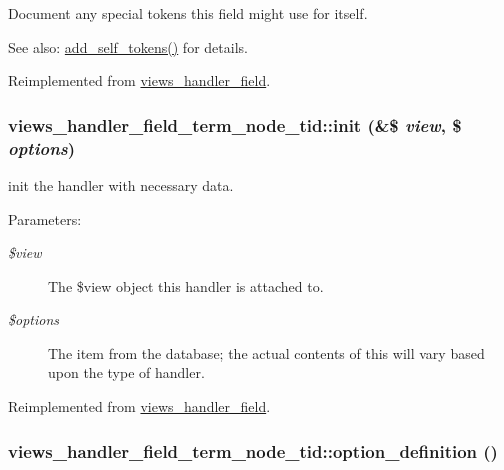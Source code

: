 Document any special tokens this field might use for itself.

\begin{Desc}
\item[See also:]\hyperlink{classviews__handler__field__term__node__tid_7fea3443ab075e3e35212ddc3b0d95f3}{add\_\-self\_\-tokens()} for details. \end{Desc}


Reimplemented from \hyperlink{classviews__handler__field_e33446d1059f13fbfb06a37da04d320e}{views\_\-handler\_\-field}.\hypertarget{classviews__handler__field__term__node__tid_639e45d86c954e90120193b84c8b910b}{
\subsubsection[{init}]{\setlength{\rightskip}{0pt plus 5cm}views\_\-handler\_\-field\_\-term\_\-node\_\-tid::init (\&\$ {\em view}, \/  \$ {\em options})}}
\label{classviews__handler__field__term__node__tid_639e45d86c954e90120193b84c8b910b}


init the handler with necessary data. \begin{Desc}
\item[Parameters:]
\begin{description}
\item[{\em \$view}]The \$view object this handler is attached to. \item[{\em \$options}]The item from the database; the actual contents of this will vary based upon the type of handler. \end{description}
\end{Desc}


Reimplemented from \hyperlink{classviews__handler__field_7eaaf0fd6fbc57c2955f88b257394d19}{views\_\-handler\_\-field}.\hypertarget{classviews__handler__field__term__node__tid_6c6e6369b1897f4f6643a609b1a802a5}{
\subsubsection[{option\_\-definition}]{\setlength{\rightskip}{0pt plus 5cm}views\_\-handler\_\-field\_\-term\_\-node\_\-tid::option\_\-definition ()}}
\label{classviews__handler__field__term__node__tid_6c6e6369b1897f4f6643a609b1a802a5}


